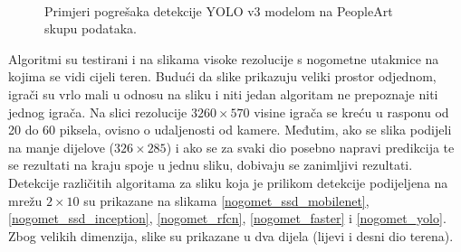 \begin{figure}[H]
\begin{center}
 \
 \
\caption{Primjeri pogrešaka detekcije YOLO v3 modelom na PeopleArt skupu podataka.}
\end{center}
\end{figure}

Algoritmi su testirani i na slikama visoke rezolucije s nogometne utakmice na kojima se vidi cijeli teren. Budući da slike prikazuju veliki prostor odjednom, igrači su vrlo mali u odnosu na sliku i niti jedan algoritam ne prepoznaje niti jednog igrača. Na slici rezolucije $3260 \times 570$ visine igrača se kreću u rasponu od 20 do 60 piksela, ovisno o udaljenosti od kamere. Međutim, ako se slika podijeli na manje dijelove ($326 \times 285$) i ako se za svaki dio posebno napravi predikcija te se rezultati na kraju spoje u jednu sliku, dobivaju se zanimljivi rezultati. Detekcije različitih algoritama za sliku koja je prilikom detekcije podijeljena na mrežu $2 \times 10$ su prikazane na slikama \ref{nogomet_ssd_mobilenet}, \ref{nogomet_ssd_inception}, \ref{nogomet_rfcn}, \ref{nogomet_faster} i \ref{nogomet_yolo}. Zbog velikih dimenzija, slike su prikazane u dva dijela (lijevi i desni dio terena).

